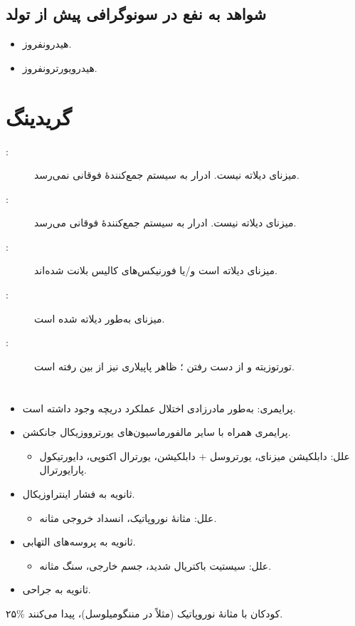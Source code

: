 \subsection*{شواهد به نفع  در سونوگرافی پیش از تولد}
\begin{itemize}
\item هیدرونفروز.
\item هیدرویورترونفروز.
\end{itemize}
\section*{گریدینگ }
\begin{description}
\item[:] میزنای دیلاته نیست. ادرار به سیستم جمع‌کنندهٔ فوقانی نمی‌رسد.
\item[:] میزنای دیلاته نیست. ادرار به سیستم جمع‌کنندهٔ فوقانی می‌رسد.
\item[:] میزنای دیلاته است و/یا فورنیکس‌های کالیس  بلانت شده‌اند.
\item[:] میزنای به‌طور  دیلاته شده است.
\item[:] تورتوزیته و از دست رفتن ؛ ظاهر پاپیلاری نیز از بین رفته است.
\end{description}

\section*{}
\begin{itemize}
\item پرایمری: به‌طور مادرزادی اختلال عملکرد دریچه وجود داشته است.
\item پرایمری همراه با سایر مالفورماسیون‌های یورترووزیکال جانکشن.
\begin{itemize}
\item علل: دابلکیشن میزنای، یورتروسل + دابلکیشن، یورترال اکتوپی، دایورتیکول پارایورترال.
\end{itemize}
\item ثانویه به فشار اینتراوزیکال.
\begin{itemize}
\item علل: مثانهٔ نوروپاتیک، انسداد خروجی مثانه.
\end{itemize}
\item ثانویه به پروسه‌های التهابی.
\begin{itemize}
\item علل: سیستیت باکتریال شدید، جسم خارجی، سنگ مثانه.
\end{itemize}
\item ثانویه به جراحی.
\end{itemize}
۲۵\% کودکان با مثانهٔ نوروپاتیک (مثلاً در مننگومیلوسل)،  پیدا می‌کنند.

